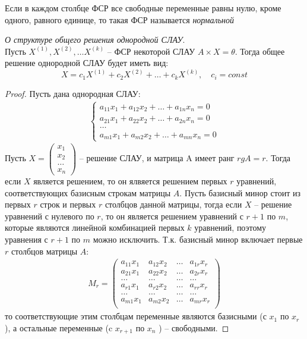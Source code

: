 \begin{definition}
  Если в каждом столбце ФСР все свободные переменные равны нулю, кроме одного, равного единице, то такая ФСР называется \textit{нормальной} 
\end{definition}

\begin{theorem}
  \textit{О структуре общего решения однородной СЛАУ}. \\
  Пусть $X^{(1)}, X^{(2)}, \ldots X^{(k)}$ -- ФСР некоторой СЛАУ $A \times X = \theta$. Тогда общее решение однородной СЛАУ будет иметь вид: \[
    X = c_1 X^{(1)} + c_2 X^{(2)} + \ldots + c_k X^{(k)}, \quad c_i = const
  \] 
\end{theorem}
\begin{proof}
  Пусть дана однородная СЛАУ:
  \begin{align*}
    \begin{cases}
      a_{11} x_1 + a_{12} x_2 + \ldots + a_{1n} x_{n} = 0 \\
      a_{21} x_1 + a_{22} x_2 + \ldots + a_{2n} x_{n} = 0 \\
      \ldots \\
      a_{m1} x_1 + a_{m2} x_2 + \ldots + a_{mn} x_{n} = 0
    \end{cases} \tag{1}
  \end{align*}
  Пусть $X = \left( \begin{matrix} x_1 \\ x_2 \\ \ldots \\ x_{n} \end{matrix} \right) $ -- решение СЛАУ, и матрица A имеет ранг $rg A = r$. 
  Тогда если $X$ является решением, то он ялвяется решением первых $r$ уравнений, соответствующих базисным строкам матрицы $A$.
  Пусть базисный минор стоит из первых $r$ строк и первых $r$ столбцов данной матрицы, тогда если $X$ -- решение уравнений с нулевого по $r$, то он является решением уравнений с  $r+1$ по $m$, которые являются линейной комбинацией первых  $k$ уравнений, поэтому уравнения с  $r+1$ по $m$ можно исключить.
  Т.к. базисный минор включает первые $r$ столбцов матрицы  $A$:
  \begin{gather*}
    M_r =
    \begin{pmatrix}
      a_{11} x_1 & a_{12} x_2 & \ldots & a_{1r} x_r \\
      a_{21} x_1 & a_{22} x_2 & \ldots & a_{2r} x_r \\
      \ldots & \ldots & \ldots & \ldots \\
      a_{r1} x_1 & a_{r2} x_2 & \ldots & a_{rr} x_r \\
      \ldots & \ldots & \ldots & \ldots \\
      a_{m1} x_1 & a_{m2} x_2 & \ldots & a_{mr} x_r \\
    \end{pmatrix}
  \end{gather*}
  то соответствующие этим столбцам переменные являются базисными (с $x_1$ по $x_{r}$), а остальные переменные (c $x_{r+1}$ по $ x_n$ ) -- свободными.


\end{proof}
